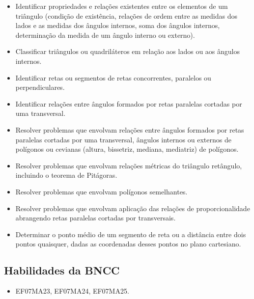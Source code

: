 \begin{itemize}
\item Identificar propriedades e relações existentes
entre os elementos de um triângulo (condição de existência, relações de
ordem entre as medidas dos lados e as medidas dos ângulos internos, soma
dos ângulos internos, determinação da medida de um ângulo interno ou
externo).
\item
  Classificar triângulos ou quadriláteros em relação aos lados ou aos
  ângulos internos.
\item
  Identificar retas ou segmentos de retas concorrentes, paralelos ou
  perpendiculares.
\item
  Identificar relações entre ângulos formados por retas paralelas
  cortadas por uma transversal.
\item
  Resolver problemas que envolvam relações entre ângulos formados por
  retas paralelas cortadas por uma transversal, ângulos internos ou
  externos de polígonos ou cevianas (altura, bissetriz, mediana,
  mediatriz) de polígonos.
\item
  Resolver problemas que envolvam relações métricas do triângulo
  retângulo, incluindo o teorema de Pitágoras.
\item
  Resolver problemas que envolvam polígonos semelhantes.
\item
  Resolver problemas que envolvam aplicação das relações de
  proporcionalidade abrangendo retas paralelas cortadas por
  transversais.
\item
  Determinar o ponto médio de um segmento de reta ou a distância entre
  dois pontos quaisquer, dadas as coordenadas desses pontos no plano
  cartesiano.
\end{itemize}

\subsection{Habilidades da BNCC}
\begin{itemize}
\item EF07MA23, EF07MA24, EF07MA25.
\end{itemize}


